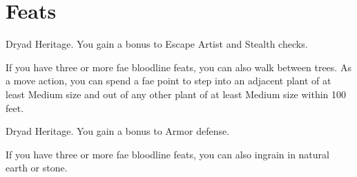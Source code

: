 
\section{Feats}

    \featpre Dryad Heritage.
    \featben You gain a  bonus to Escape Artist and Stealth checks.

    If you have three or more fae bloodline feats, you can also walk between trees. As a move action, you can spend a fae point to step into an adjacent plant of at least Medium size and out of any other plant of at least Medium size within 100 feet.

    \featpre Dryad Heritage.
    \featben You gain a  bonus to Armor defense.

    If you have three or more fae bloodline feats, you can also ingrain in natural earth or stone.

